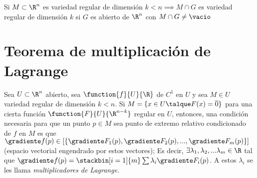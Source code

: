 \begin{observacion} Si $M\subset\R^n$ es variedad regular de dimensión $k<n\implies M\cap G$ es variedad regular de dimensión $k$ si $G$ es abierto de $\R^n$ con $M\cap G\neq\vacio$
\end{observacion}

\section{Teorema de multiplicación de Lagrange}

\begin{teor} Sea $U\subset\R^n$ abierto, sea $\function{f}{U}{\R}$ de $C^1$ en $U$ y sea $M\in U$ variedad regular de dimensión $k<n$. Si $M=\{x\in U\talque F(x)=\overline{0}\}$ para una cierta función $\function{F}{U}{\R^{n-k}}$ regular en $U$, entonces, una condición necesaria para que un punto $p\in M$ sea punto de extremo relativo condicionado de $f$ en $M$ es que \\
$\gradiente f(p)\in [\{\gradiente F_1(p),\gradiente F_2(p),...,\gradiente F_m(p)\}]$ (espacio vectorial engendrado por estos vectores); Es decir, $\exists \lambda_1,\lambda_2,...\lambda_m\in\R$ tal que $\gradiente f(p)=\stackbin[i=1]{m}\sum\lambda_i\gradiente F_i(p)$. A estos $\lambda_i$ se les llama \textit{multiplicadores de Lagrange}.
\end{teor}

